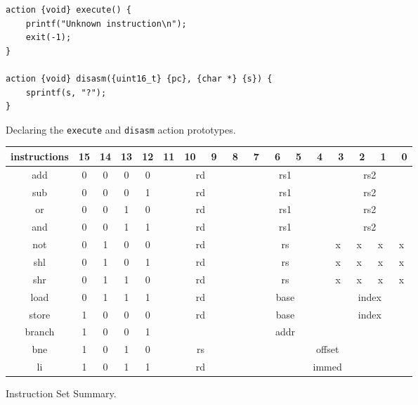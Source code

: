 \begin{figure}[ht]
\begin{verbatim}
action {void} execute() {
    printf("Unknown instruction\n");
    exit(-1);
}

action {void} disasm({uint16_t} {pc}, {char *} {s}) {
    sprintf(s, "?");
}
\end{verbatim}
\caption{Declaring the \texttt{execute} and \texttt{disasm} action prototypes.}
\label{action}
\end{figure}

\begin{figure}[h!tb]
	\begin{center}
		\begin{tabular}{|c|c|c|c|c|c|c|c|c|c|c|c|c|c|c|c|c|}
			\hline
			instructions &  15  &  14  &  13  &  12  &  11  &  10  &  ~9  & ~8  &  ~7  &  ~6  &  ~5  &  ~4  &  ~3  &  ~2  &  ~1  &  ~0 \\
			\hline
			add    &   0  &   0  &   0  &   0  & \multicolumn{4}{|c|}{rd} & \multicolumn{4}{|c|}{rs1} & \multicolumn{4}{|c|}{rs2}\\
			\hline
			sub    &   0  &   0  &   0  &   1  & \multicolumn{4}{|c|}{rd} & \multicolumn{4}{|c|}{rs1} & \multicolumn{4}{|c|}{rs2}\\
			\hline
			or     &   0  &   0  &   1  &   0  & \multicolumn{4}{|c|}{rd} & \multicolumn{4}{|c|}{rs1} & \multicolumn{4}{|c|}{rs2}\\
			\hline
			and    &   0  &   0  &   1  &   1  & \multicolumn{4}{|c|}{rd} & \multicolumn{4}{|c|}{rs1} & \multicolumn{4}{|c|}{rs2}\\
			\hline
			not    &   0  &   1  &   0  &   0  & \multicolumn{4}{|c|}{rd}  & \multicolumn{4}{|c|}{rs} &   x  &   x  &   x  &   x \\
			\hline
			shl    &   0  &   1  &   0  &   1  & \multicolumn{4}{|c|}{rd}  & \multicolumn{4}{|c|}{rs} &   x  &   x  &   x  &   x \\
			\hline
			shr    &   0  &   1  &   1  &   0  & \multicolumn{4}{|c|}{rd}  & \multicolumn{4}{|c|}{rs} &   x  &   x  &   x  &   x \\
			\hline
			load   &   0  &   1  &   1  &   1  & \multicolumn{4}{|c|}{rd}  & \multicolumn{4}{|c|}{base} & \multicolumn{4}{|c|}{index}\\
			\hline
			store  &   1  &   0  &   0  &   0  & \multicolumn{4}{|c|}{rd}  & \multicolumn{4}{|c|}{base} & \multicolumn{4}{|c|}{index}\\
			\hline
			branch &   1  &   0  &   0  &   1  & \multicolumn{12}{|c|}{addr}\\
			\hline
			bne    &   1  &   0  &   1  &   0  & \multicolumn{4}{|c|}{rs} & \multicolumn{8}{|c|}{offset}\\
			\hline
			li     &   1  &   0  &   1  &   1  & \multicolumn{4}{|c|}{rd} & \multicolumn{8}{|c|}{immed}\\
			\hline
		\end{tabular}
		\caption{Instruction Set Summary.}
		\label{instruction_set_summary}
	\end{center}
\end{figure}

